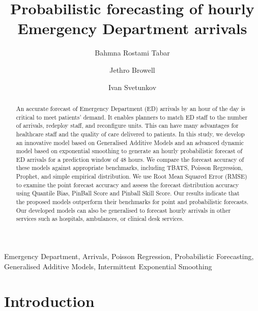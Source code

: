 \documentclass[]{elsarticle} %
\begin{document}
\begin{frontmatter}

  \title{Probabilistic forecasting of hourly Emergency Department arrivals}
    \author[Cardiff Business School]{Bahmna Rostami Tabar}
    \author[University of Glasgow]{Jethro Browell}
    \author[Lancaster University]{Ivan Svetunkov}
      \address[Cardiff Business School]{Cardiff Business School, Cardiff University, UK}
    \address[University of Glasgow]{School of Mathematics and Statistics, University of Glasgow, UK}
    \address[Lancaster University]{Centre for Marketing Analytics and Forecasting, Lancaster University, UK}
  
  \begin{abstract}
  An accurate forecast of Emergency Department (ED) arrivals by an hour of the day is critical to meet patients' demand. It enables planners to match ED staff to the number of arrivals, redeploy staff, and reconfigure units. This can have many advantages for healthcare staff and the quality of care delivered to patients. In this study, we develop an innovative model based on Generalised Additive Models and an advanced dynamic model based on exponential smoothing to generate an hourly probabilistic forecast of ED arrivals for a prediction window of 48 hours. We compare the forecast accuracy of these models against appropriate benchmarks, including TBATS, Poisson Regression, Prophet, and simple empirical distribution. We use Root Mean Squared Error (RMSE) to examine the point forecast accuracy and assess the forecast distribution accuracy using Quantile Bias, PinBall Score and Pinball Skill Score. Our results indicate that the proposed models outperform their benchmarks for point and probabilistic forecasts. Our developed models can also be generalised to forecast hourly arrivals in other services such as hospitals, ambulances, or clinical desk services.
  \end{abstract}
   \begin{keyword} Emergency Department, Arrivals, Poisson Regression, Probabilistic Forecasting, Generalised Additive Models, Intermittent Exponential Smoothing\end{keyword}
 \end{frontmatter}

\hypertarget{introduction}{%
\section{Introduction}\label{introduction}}
\end{document}
